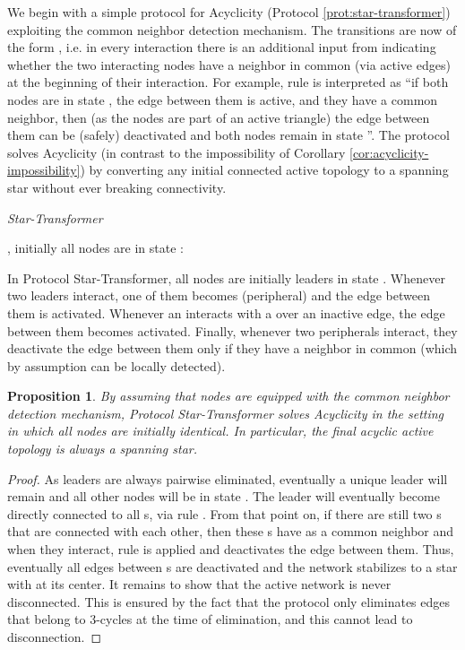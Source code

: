 \documentclass[preprint]{elsarticle}
\newtheorem{proposition}{Proposition}
\begin{document}
We begin with a simple protocol for Acyclicity (Protocol \ref{prot:star-transformer}) exploiting the common neighbor detection mechanism. The transitions are now of the form , i.e. in every interaction there is an additional input from  indicating whether the two interacting nodes have a neighbor in common (via active edges) at the beginning of their interaction. For example, rule  is interpreted as ``if both nodes are in state , the edge between them is active, and they have a common neighbor, then (as the nodes are part of an active triangle) the edge between them can be (safely) deactivated and both nodes remain in state ''. The protocol solves Acyclicity (in contrast to the impossibility of Corollary \ref{cor:acyclicity-impossibility}) by converting any initial connected active topology to a spanning star without ever breaking connectivity.

\renewcommand{\algorithmiccomment}[1]{// #1}
\begin{algorithm}[!h]
  \caption{\emph{Star-Transformer}}\label{prot:star-transformer}
  \begin{algorithmic}
    \medskip
    \State , initially all nodes are in state 
    \State : 
    
    \State {}
  \end{algorithmic}
\end{algorithm}

In Protocol Star-Transformer, all nodes are initially leaders in state . Whenever two leaders interact, one of them becomes 
(peripheral) and the edge between them is activated. Whenever an  interacts with a  over an inactive edge, the edge between them becomes activated. Finally, whenever two peripherals interact, they deactivate the edge between them only if they
have a neighbor in common (which by assumption can be locally detected).

\begin{proposition}
By assuming that nodes are equipped with the common neighbor detection mechanism, Protocol Star-Transformer solves Acyclicity in the setting in which all nodes are initially identical. In particular, the final acyclic active topology is always a spanning star.
\end{proposition}
\begin{proof}
As leaders are always pairwise eliminated, eventually a unique leader will remain and all other nodes will be in state . The
leader will eventually become directly connected to all s, via rule . From that point
on, if there are still two s that are connected with each other, then these s 
have  as a common neighbor and when they interact, rule 
is applied and deactivates the edge between them. Thus, eventually all edges between s
are deactivated and the network stabilizes to a star with  at its center.
It remains to show that the active network is never disconnected. This is
ensured by the fact that the protocol only eliminates edges that belong to 3-cycles at the time of
elimination, and this cannot lead to disconnection.
\end{proof}
\end{document}
